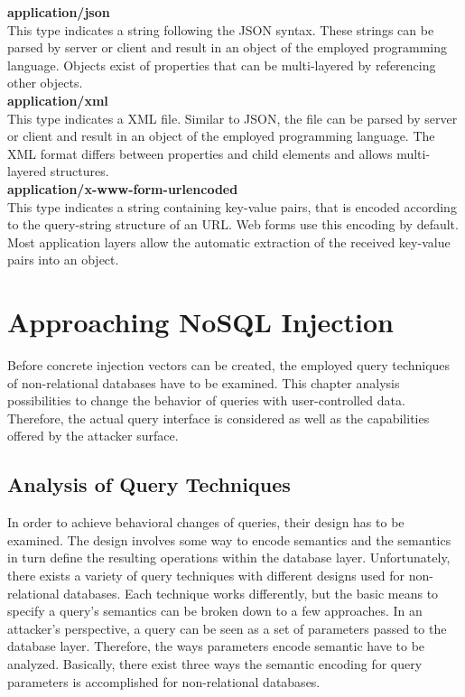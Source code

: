 \textbf{application/json} \\
This type indicates a string following the JSON syntax. These strings can be parsed by server or client and result in an object of the employed programming language. Objects exist of properties that can be multi-layered by referencing other objects. \\

\textbf{application/xml} \\
This type indicates a XML file. Similar to JSON, the file can be parsed by server or client and result in an object of the employed programming language. The XML format differs between properties and child elements and allows multi-layered structures.\\

\textbf{application/x-www-form-urlencoded} \\
This type indicates a string containing key-value pairs, that is encoded according to the query-string structure of an URL. Web forms use this encoding by default. Most application layers allow the automatic extraction of the received key-value pairs into an object.

\chapter{Approaching NoSQL Injection}
Before concrete injection vectors can be created, the employed query techniques of non-relational databases have to be examined. This chapter analysis possibilities to change the behavior of queries with user-controlled data. Therefore, the actual query interface is considered as well as the capabilities offered by the attacker surface.

\section{Analysis of Query Techniques}
\label{sec:analysisOfQueryTechniques}
In order to achieve behavioral changes of queries, their design has to be examined. The design involves some way to encode semantics and the semantics in turn define the resulting operations within the database layer. Unfortunately, there exists a variety of query techniques with different designs used for non-relational databases. Each technique works differently, but the basic means to specify a query's semantics can be broken down to a few approaches. In an attacker's perspective, a query can be seen as a set of parameters passed to the database layer. Therefore, the ways parameters encode semantic have to be analyzed. Basically, there exist three ways the semantic encoding for query parameters is accomplished for non-relational databases.\\

